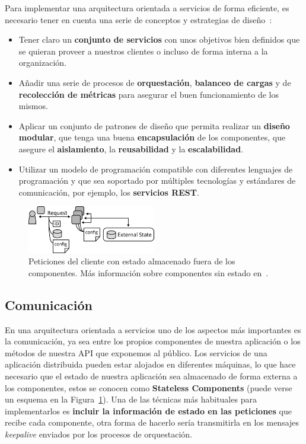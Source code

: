 Para implementar una arquitectura orientada a servicios de forma eficiente, es necesario tener en cuenta una serie de conceptos y estrategias de diseño~\cite{ibmsoa}:
\begin{itemize}
\item Tener claro un \textbf{conjunto de servicios} con unos objetivos bien definidos que se quieran proveer a nuestros clientes o incluso de forma interna a la organización.
\item Añadir una serie de procesos de \textbf{orquestación}, \textbf{balanceo de cargas} y de \textbf{recolección de métricas} para asegurar el buen funcionamiento de los mismos.
\item Aplicar un conjunto de patrones de diseño que permita realizar un \textbf{diseño modular}, que tenga una buena \textbf{encapsulación} de los componentes, que asegure el \textbf{aislamiento}, la \textbf{reusabilidad} y la \textbf{escalabilidad}.
\item Utilizar un modelo de programación compatible con diferentes lenguajes de programación y que sea soportado por múltiples tecnologías y estándares de comunicación, por ejemplo, los \textbf{servicios REST}.
\end{itemize}

\begin{figure}
\centering
\includegraphics[width=0.5\textwidth]{stateless.png}
\caption{\label{fig:scomm}Peticiones del cliente con estado almacenado fuera de los componentes. Más información sobre componentes sin estado en~\cite{sless}.}
\end{figure}

\subsection{Comunicación}\label{sec:intro}
En una arquitectura orientada a servicios uno de los aspectos más importantes es la comunicación, ya sea entre los propios componentes de nuestra aplicación o los métodos de nuestra API que exponemos al público. Los servicios de una aplicación distribuida pueden estar alojados en diferentes máquinas, lo que hace necesario que el estado de nuestra aplicación sea almacenado de forma externa a los componentes, estos se conocen como \textbf{Stateless Components}  (puede verse un esquema en la Figura~\ref{fig:scomm}). Una de las técnicas más habituales para implementarlos es \textbf{incluir la información de estado en las peticiones} que recibe cada componente, otra forma de hacerlo sería transmitirla en los mensajes \emph{keepalive} enviados por los procesos de orquestación.

